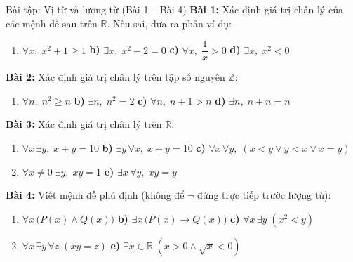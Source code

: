 \documentclass[12pt,a4paper]{article}
\begin{document}
\begin{baitap}{Bài tập: Vị từ và lượng từ (Bài 1 -- Bài 4)}
\textbf{Bài 1:} Xác định giá trị chân lý của các mệnh đề sau trên $\mathbb{R}$. Nếu sai, đưa ra phản ví dụ:
\begin{enumerate}[label=\textbf{\alph*)}, itemsep=1pt]
  \item $\forall x,\; x^2 + 1 \ge 1$ \qquad
  \textbf{b)} $\exists x,\; x^2 - 2 = 0$ \qquad
  \textbf{c)} $\forall x,\; \dfrac{1}{x} > 0$ \qquad
  \textbf{d)} $\exists x,\; x^2 < 0$
\end{enumerate}

\textbf{Bài 2:} Xác định giá trị chân lý trên tập số nguyên $\mathbb{Z}$:
\begin{enumerate}[label=\textbf{\alph*)}, itemsep=1pt]
  \item $\forall n,\; n^2 \ge n$ \qquad
  \textbf{b)} $\exists n,\; n^2 = 2$ \qquad
  \textbf{c)} $\forall n,\; n + 1 > n$ \qquad
  \textbf{d)} $\exists n,\; n + n = n$
\end{enumerate}

\textbf{Bài 3:} Xác định giá trị chân lý trên $\mathbb{R}$:
\begin{enumerate}[label=\textbf{\alph*)}, itemsep=1pt]
  \item $\forall x\,\exists y,\; x + y = 10$ \qquad
  \textbf{b)} $\exists y\,\forall x,\; x + y = 10$ \qquad
  \textbf{c)} $\forall x\,\forall y,\; (x < y \lor y < x \lor x = y)$
  \item[\textbf{d)}] $\forall x \neq 0\;\exists y,\; xy = 1$ \qquad
  \textbf{e)} $\exists x\,\forall y,\; xy = y$
\end{enumerate}

\textbf{Bài 4:} Viết mệnh đề phủ định (không để $\neg$ đứng trực tiếp trước lượng từ):
\begin{enumerate}[label=\textbf{\alph*)}, itemsep=1pt]
  \item $\forall x\,\big(P(x) \land Q(x)\big)$ \qquad
  \textbf{b)} $\exists x\,\big(P(x) \to Q(x)\big)$ \qquad
  \textbf{c)} $\forall x\,\exists y\;(x^2 < y)$
  \item[\textbf{d)}] $\forall x\,\exists y\,\forall z\;(xy = z)$ \qquad
  \textbf{e)} $\exists x \in \mathbb{R}\;(x > 0 \land \sqrt{x} < 0)$
\end{enumerate}
\end{baitap}
\end{document}
